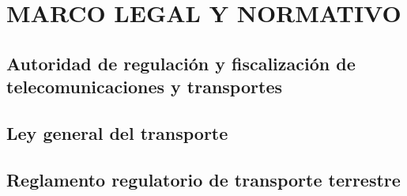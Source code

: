 	
	
	\section{MARCO LEGAL Y NORMATIVO}
	\subsection{Autoridad de regulación y fiscalización de telecomunicaciones y transportes}
	\subsection{Ley general del transporte}
	\subsection{Reglamento regulatorio de transporte terrestre}


